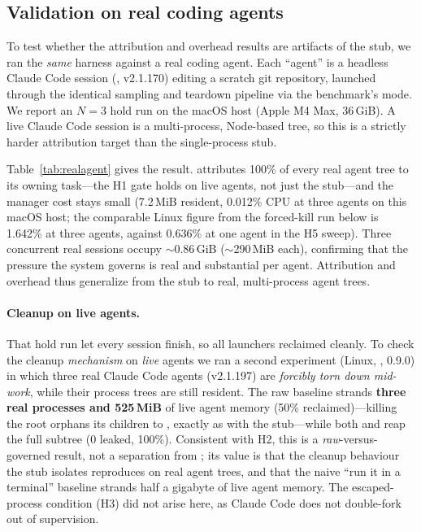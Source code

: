 \subsection{Validation on real coding agents}
\label{sec:realagent}

To test whether the attribution and overhead results are artifacts of the stub, we ran the
\emph{same} harness against a real coding agent. Each ``agent'' is a headless Claude Code session
(, v2.1.170) editing a scratch git repository, launched through the identical
sampling and teardown pipeline via the benchmark's  mode. We report an $N{=}3$
hold run on the macOS host (Apple M4 Max, 36\,GiB). A live Claude Code session is a multi-process,
Node-based tree, so this is a strictly harder attribution target than the single-process stub.

Table~\ref{tab:realagent} gives the result. \sys{} attributes 100\% of every real agent tree to its
owning task---the H1 gate holds on live agents, not just the stub---and the manager cost stays small
(7.2\,MiB resident, 0.012\% CPU at three agents on this macOS host; the comparable Linux figure
from the forced-kill run below is 1.642\% at three agents, against 0.636\% at one agent in the H5
sweep). Three concurrent real sessions occupy $\sim$0.86\,GiB ($\sim$290\,MiB each), confirming that
the pressure the system governs is real and substantial per agent. Attribution and overhead thus
generalize from the stub to real, multi-process agent trees.

\paragraph{Cleanup on live agents.} That hold run let every session finish, so all launchers reclaimed
cleanly. To check the cleanup \emph{mechanism} on \emph{live} agents we ran a second experiment (Linux,
, \sys{} 0.9.0) in which three real Claude Code agents (v2.1.197) are \emph{forcibly torn down
mid-work}, while their  process trees are still resident. The raw baseline strands
\textbf{three real processes and 525\,MiB} of live agent memory (50\% reclaimed)---killing the root
 orphans its children to , exactly as with the stub---while both  and
\sys{} reap the full subtree (0 leaked, 100\%). Consistent with H2, this is a \emph{raw}-versus-governed
result, not a separation from ; its value is that the cleanup behaviour the stub isolates
reproduces on real agent trees, and that the naive ``run it in a terminal'' baseline strands half a
gigabyte of live agent memory. The escaped-process condition (H3) did not arise here, as Claude Code
does not double-fork out of supervision.

